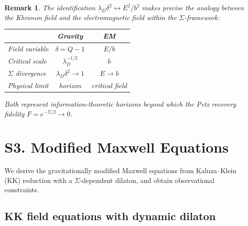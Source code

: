 \documentclass[letterpaper,twocolumn,superscriptaddress,longbibliography]{revtex4-2}
\newtheorem*{remark}{Remark}
\begin{document}
\begin{remark}
The identification $\lambda_D\delta^2 \leftrightarrow E^2/b^2$
makes precise the analogy between the Khronon field and
the electromagnetic field within the $\Sigma$-framework:
\begin{center}
\begin{tabular}{lcc}
\toprule
 & \textbf{Gravity} & \textbf{EM} \\
\midrule
Field variable & $\delta = Q-1$ & $E/b$ \\
Critical scale & $\lambda_D^{-1/2}$ & $b$ \\
$\Sigma$ divergence & $\lambda_D\delta^2 \to 1$ & $E \to b$ \\
Physical limit & horizon & critical field \\
\bottomrule
\end{tabular}
\end{center}
Both represent information-theoretic horizons beyond which
the Petz recovery fidelity $F = e^{-\Sigma/2} \to 0$.
\end{remark}


\section{S3. Modified Maxwell Equations}
\label{sec:maxwell}

We derive the gravitationally modified Maxwell equations
from Kaluza--Klein (KK) reduction with a $\Sigma$-dependent
dilaton, and obtain observational constraints.

\subsection{KK field equations with dynamic dilaton}
\label{sec:KK}
\end{document}
